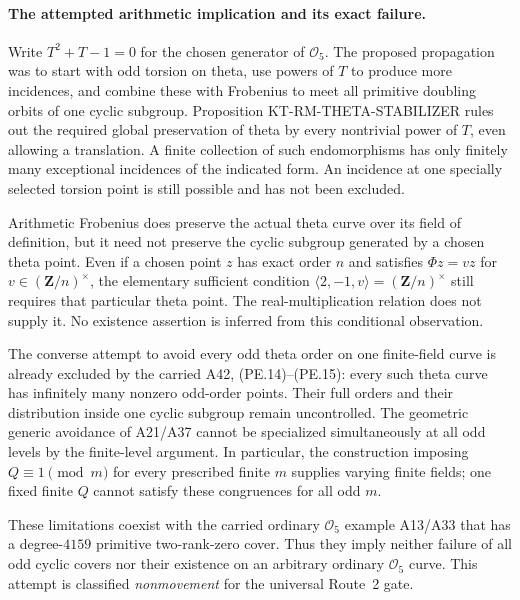 \paragraph{The attempted arithmetic implication and its exact failure.}
Write $T^2+T-1=0$ for the chosen generator of $\mathcal O_5$.
The proposed propagation was to start with odd torsion on theta,
use powers of $T$ to produce more incidences, and combine these
with Frobenius to meet all primitive doubling orbits of one
cyclic subgroup.  Proposition KT-RM-THETA-STABILIZER rules out
the required global preservation of theta by every nontrivial
power of $T$, even allowing a translation.  A finite collection
of such endomorphisms has only finitely many exceptional
incidences of the indicated form.  An incidence at one specially
selected torsion point is still possible and has not been excluded.

Arithmetic Frobenius does preserve the actual theta curve over
its field of definition, but it need not preserve the cyclic
subgroup generated by a chosen theta point.  Even if a chosen
point $z$ has exact order $n$ and satisfies $\Phi z=vz$ for
$v\in(\mathbf Z/n)^\times$, the elementary sufficient condition
$\langle2,-1,v\rangle=(\mathbf Z/n)^\times$ still requires
that particular theta point.  The real-multiplication relation
does not supply it.  No existence assertion is inferred from
this conditional observation.

The converse attempt to avoid every odd theta order on one
finite-field curve is already excluded by the carried A42,
(PE.14)--(PE.15): every such theta curve has infinitely many
nonzero odd-order points.  Their full orders and their distribution
inside one cyclic subgroup remain uncontrolled.  The geometric
generic avoidance of A21/A37 cannot be specialized simultaneously
at all odd levels by the finite-level argument.  In particular,
the construction imposing $Q\equiv1\pmod m$ for every prescribed
finite $m$ supplies varying finite fields; one fixed finite
$Q$ cannot satisfy these congruences for all odd $m$.

These limitations coexist with the carried ordinary
$\mathcal O_5$ example A13/A33 that has a degree-$4159$
primitive two-rank-zero cover.  Thus they imply neither failure
of all odd cyclic covers nor their existence on an arbitrary
ordinary $\mathcal O_5$ curve.  This attempt is classified
\emph{nonmovement} for the universal Route~2 gate.

